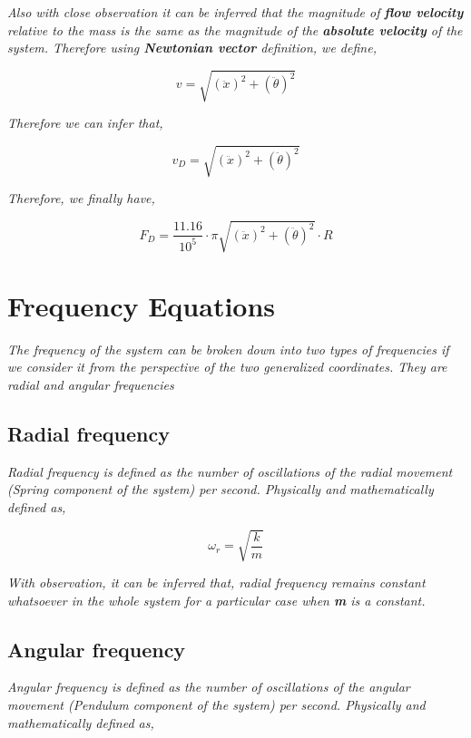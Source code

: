     \textit{Also with close observation it can be inferred that the magnitude of \textbf{flow velocity} relative to the mass is the same as the magnitude of the \textbf{absolute velocity} of the system. Therefore using \textbf{Newtonian vector} definition, we define,}
            
        $$v = \sqrt{(\ddot{x})^2 + (\ddot{\theta})^2}$$
        
    \textit{Therefore we can infer that,}
        
        $$v_D = \sqrt{(\ddot{x})^2 + (\ddot{\theta})^2}$$
            
    \textit{Therefore, we finally have,}
            
        $$F_D = \frac{11.16}{10^{5}}\cdot\pi\sqrt{(\ddot{x})^2 + (\ddot{\theta})^2}\cdot R$$
            
\section{{Frequency Equations}}
            
    \textit{The frequency of the system can be broken down into two types of frequencies if we consider it from the perspective of the two generalized coordinates. They are radial and angular frequencies}
            
    \subsection{{Radial frequency}}
                
        \textit{Radial frequency is defined as the number of oscillations of the radial movement (Spring component of the system) per second. Physically and mathematically defined as,}
                
            $$\omega_r = \sqrt{\frac{k}{m}}$$
                
        \textit{With observation, it can be inferred that, radial frequency remains constant whatsoever in the whole system for a particular case when \textbf{m} is a constant.}
            
    \subsection{{Angular frequency}}
                
        \textit{Angular frequency is defined as the number of oscillations of the angular movement (Pendulum component of the system) per second. Physically and mathematically defined as,}
                
